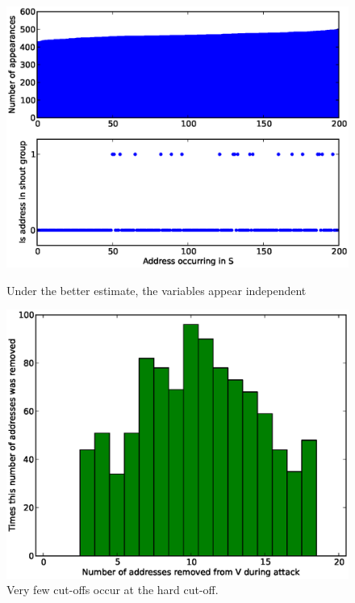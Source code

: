 \documentclass[ %
                    author={Luke Murray},
                supervisor={Dr. Simon Hollis},
                     title={Shadow Peer-to-Peer Networks},
                  subtitle={},
                    degree={MEng},
                      year={2013} ]{thesis}
\begin{document}
\begin{figure}[h]
    \centering
    \begin{minipage}[b]{0.45\linewidth}
        \centering
        \includegraphics[width=\linewidth]{diagrams/better1.eps}
        \caption{Under the better estimate, the variables appear independent}
        \label{threshold_attack_better1}
    \end{minipage}
    \hspace{0.5cm}
    \begin{minipage}[b]{0.45\linewidth}
        \centering
        \includegraphics[width=\linewidth]{diagrams/better2.eps}
        \caption{Very few cut-offs occur at the hard cut-off.}
        \label{threshold_attack_better2}
    \end{minipage}
\end{figure}
\end{document}
